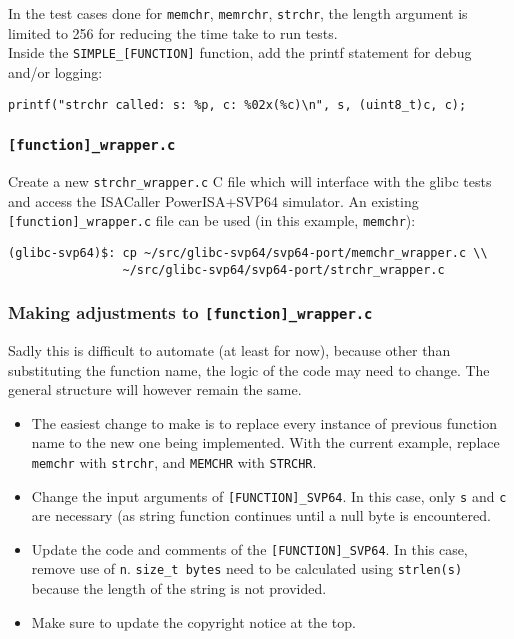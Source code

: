 In the test cases done for \texttt{memchr}, \texttt{memrchr}, \texttt{strchr},
the length argument is limited to 256 for reducing the time take to run tests.\\

Inside the \texttt{SIMPLE\_[FUNCTION]} function, add the printf statement
for debug and/or logging:

\begin{verbatim}
printf("strchr called: s: %p, c: %02x(%c)\n", s, (uint8_t)c, c);
\end{verbatim}

\subsubsection{\texttt{[function]\_wrapper.c}}

Create a new \texttt{strchr\_wrapper.c} C file which will interface with
the glibc tests and access the ISACaller PowerISA+SVP64 simulator. An existing
\texttt{[function]\_wrapper.c} file can be used (in this example,
\texttt{memchr}):

\begin{verbatim}
(glibc-svp64)$: cp ~/src/glibc-svp64/svp64-port/memchr_wrapper.c \\
                ~/src/glibc-svp64/svp64-port/strchr_wrapper.c
\end{verbatim}

\subsubsection{Making adjustments to \texttt{[function]\_wrapper.c}}

Sadly this is difficult to automate (at least for now), because other than
substituting the function name, the logic of the code may need to change.
The general structure will however remain the same.

\begin{itemize}
  \item The easiest change to make is to replace every instance of previous
  function name to the new one being implemented. With the current example,
  replace \texttt{memchr} with \texttt{strchr},
  and \texttt{MEMCHR} with \texttt{STRCHR}.
  \item Change the input arguments of \texttt{[FUNCTION]\_SVP64}.
  In this case, only \texttt{s} and \texttt{c} are necessary
  (as string function continues until a null byte is encountered.
  \item Update the code and comments of the \texttt{[FUNCTION]\_SVP64}.
  In this case, remove use of \texttt{n}. \texttt{size\_t bytes} need to be
  calculated using \texttt{strlen(s)} because the length of the string
  is not provided.
  \item Make sure to update the copyright notice at the top.
\end{itemize}

